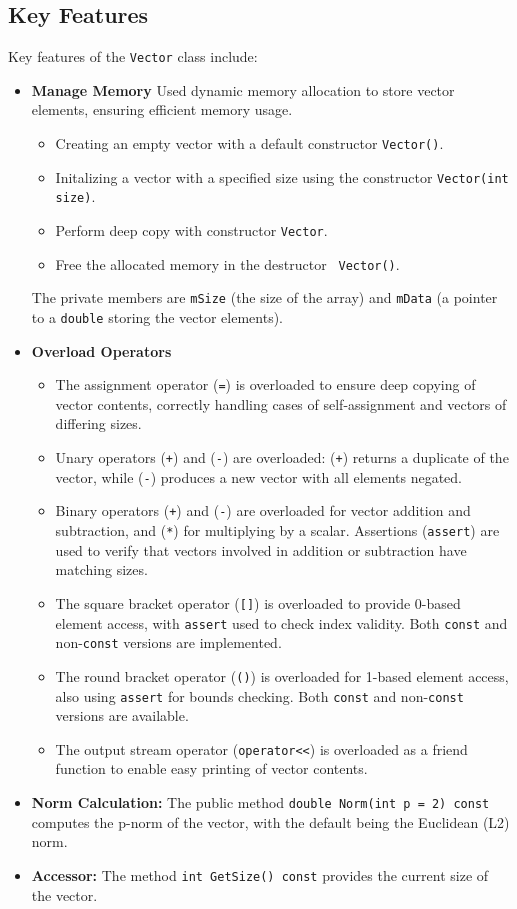 \subsection{Key Features}
Key features of the \texttt{Vector} class include: 
\begin{itemize}
    \item \textbf{Manage Memory} Used dynamic memory allocation to store vector elements, ensuring efficient memory usage.
        \begin{itemize}
                \item Creating an empty vector with a default constructor \texttt{Vector()}.
                \item Initalizing a vector with a specified size using the constructor \texttt{Vector(int size)}.
                \item Perform deep copy with constructor \texttt{Vector}.
                \item Free the allocated memory in the destructor \texttt{~Vector()}.
            \end{itemize}
    The private members are \texttt{mSize} (the size of the array) and \texttt{mData} (a pointer to a \texttt{double} storing the vector elements).

    \item \textbf{Overload Operators}
    \begin{itemize}
        \item The assignment operator (\texttt{=}) is overloaded to ensure deep copying of vector contents, correctly handling cases of self-assignment and vectors of differing sizes.
        \item Unary operators (\texttt{+}) and (\texttt{-}) are overloaded: (\texttt{+}) returns a duplicate of the vector, while (\texttt{-}) produces a new vector with all elements negated.
        \item Binary operators (\texttt{+}) and (\texttt{-}) are overloaded for vector addition and subtraction, and (\texttt{*}) for multiplying by a scalar. Assertions (\texttt{assert}) are used to verify that vectors involved in addition or subtraction have matching sizes.
        \item The square bracket operator (\texttt{[]}) is overloaded to provide 0-based element access, with \texttt{assert} used to check index validity. Both \texttt{const} and non-\texttt{const} versions are implemented.
        \item The round bracket operator (\texttt{()}) is overloaded for 1-based element access, also using \texttt{assert} for bounds checking. Both \texttt{const} and non-\texttt{const} versions are available.
        \item The output stream operator (\texttt{operator<<}) is overloaded as a friend function to enable easy printing of vector contents.
        \end{itemize}
    \item \textbf{Norm Calculation:} The public method \texttt{double Norm(int p = 2) const} computes the p-norm of the vector, with the default being the Euclidean (L2) norm.
    \item \textbf{Accessor:} The method \texttt{int GetSize() const} provides the current size of the vector.


\end{itemize}
